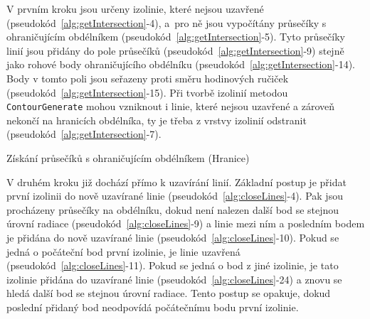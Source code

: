 V prvním kroku jsou určeny izolinie, které nejsou uzavřené
(pseudokód~\ref{alg:getIntersection}-4), a~pro ně jsou vypočítány
průsečíky s ohraničujícím obdélníkem
(pseudokód~\ref{alg:getIntersection}-5). Tyto průsečíky linií jsou
přidány do pole průsečíků (pseudokód~\ref{alg:getIntersection}-9)
stejně jako rohové body ohraničujícího obdélníku
(pseudokód~\ref{alg:getIntersection}-14). Body v tomto poli jsou
seřazeny proti směru hodinových ručiček
(pseudokód~\ref{alg:getIntersection}-15). Při tvorbě izolinií metodou
\texttt{ContourGenerate} mohou vzniknout i linie, které nejsou
uzavřené a zároveň nekončí na hranicích obdélníka, ty je třeba z
vrstvy izolinií odstranit (pseudokód~\ref{alg:getIntersection}-7).

\begin{algorithm}
\caption{Získání průsečíků s ohraničujícím obdélníkem (Hranice)}
\label{alg:getIntersection}
    \begin{algorithmic}[1] 
			\ELSE
			\ENDIF	
		\ENDIF
	\ENDWHILE
    \end{algorithmic}
\end{algorithm}

V druhém kroku již dochází přímo k uzavírání linií. Základní postup je
přidat první izolinii do nově uzavírané linie
(pseudokód~\ref{alg:closeLines}-4). Pak jsou procházeny průsečíky na
obdélníku, dokud není nalezen další bod se stejnou úrovní radiace
(pseudokód~\ref{alg:closeLines}-9) a linie mezi ním a posledním bodem
je přidána do nově uzavírané linie
(pseudokód~\ref{alg:closeLines}-10). Pokud se jedná o počáteční bod
první izolinie, je linie uzavřená
(pseudokód~\ref{alg:closeLines}-11). Pokud se jedná o bod z jiné
izolinie, je tato izolinie přidána do uzavírané linie
(pseudokód~\ref{alg:closeLines}-24) a znovu se hledá další bod se
stejnou úrovní radiace. Tento postup se opakuje, dokud poslední
přidaný bod neodpovídá počátečnímu bodu první izolinie.



